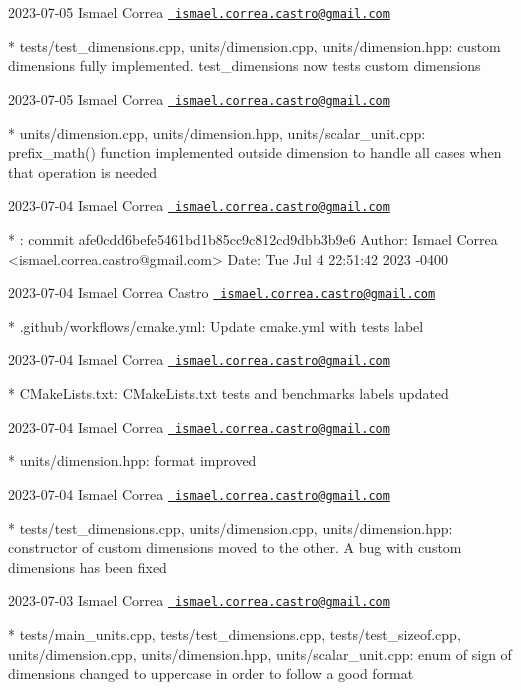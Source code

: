  2023-\/07-\/05 Ismael Correa \href{mailto:ismael.correa.castro@gmail.com}{\texttt{ ismael.\+correa.\+castro@gmail.\+com}} \begin{DoxyVerb}* tests/test_dimensions.cpp, units/dimension.cpp,
units/dimension.hpp: custom dimensions fully implemented.
test_dimensions now tests custom dimensions
\end{DoxyVerb}
 2023-\/07-\/05 Ismael Correa \href{mailto:ismael.correa.castro@gmail.com}{\texttt{ ismael.\+correa.\+castro@gmail.\+com}} \begin{DoxyVerb}* units/dimension.cpp, units/dimension.hpp, units/scalar_unit.cpp: 
prefix_math() function implemented outside dimension to handle all
cases when that operation is needed
\end{DoxyVerb}
 2023-\/07-\/04 Ismael Correa \href{mailto:ismael.correa.castro@gmail.com}{\texttt{ ismael.\+correa.\+castro@gmail.\+com}} \begin{DoxyVerb}* : commit afe0cdd6befe5461bd1b85cc9c812cd9dbb3b9e6 Author: Ismael
Correa <ismael.correa.castro@gmail.com> Date:   Tue Jul 4 22:51:42
2023 -0400
\end{DoxyVerb}
 2023-\/07-\/04 Ismael Correa Castro \href{mailto:ismael.correa.castro@gmail.com}{\texttt{ ismael.\+correa.\+castro@gmail.\+com}} \begin{DoxyVerb}* .github/workflows/cmake.yml: Update cmake.yml with tests label
\end{DoxyVerb}
 2023-\/07-\/04 Ismael Correa \href{mailto:ismael.correa.castro@gmail.com}{\texttt{ ismael.\+correa.\+castro@gmail.\+com}} \begin{DoxyVerb}* CMakeLists.txt: CMakeLists.txt tests and benchmarks labels updated
\end{DoxyVerb}
 2023-\/07-\/04 Ismael Correa \href{mailto:ismael.correa.castro@gmail.com}{\texttt{ ismael.\+correa.\+castro@gmail.\+com}} \begin{DoxyVerb}* units/dimension.hpp: format improved
\end{DoxyVerb}
 2023-\/07-\/04 Ismael Correa \href{mailto:ismael.correa.castro@gmail.com}{\texttt{ ismael.\+correa.\+castro@gmail.\+com}} \begin{DoxyVerb}* tests/test_dimensions.cpp, units/dimension.cpp,
units/dimension.hpp: constructor of custom dimensions moved to the
other. A bug with custom dimensions has been fixed
\end{DoxyVerb}
 2023-\/07-\/03 Ismael Correa \href{mailto:ismael.correa.castro@gmail.com}{\texttt{ ismael.\+correa.\+castro@gmail.\+com}} \begin{DoxyVerb}* tests/main_units.cpp, tests/test_dimensions.cpp,
tests/test_sizeof.cpp, units/dimension.cpp, units/dimension.hpp,
units/scalar_unit.cpp: enum of sign of dimensions changed to
uppercase in order to follow a good format
\end{DoxyVerb}
